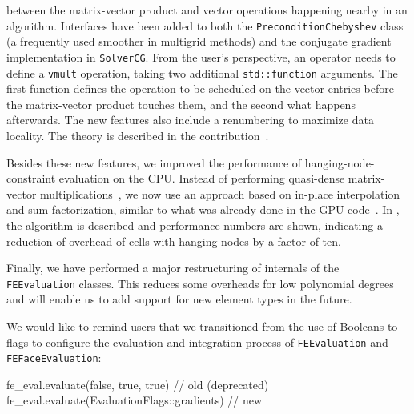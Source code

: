 \documentclass{ansarticle-preprint}
\begin{document}
\begin{itemize}
  between the matrix-vector product and vector operations happening nearby in
  an algorithm. Interfaces have been added to both the
  \texttt{PreconditionChebyshev} class (a frequently used smoother in multigrid
  methods) and the conjugate gradient implementation in \texttt{SolverCG}.
  From the user's perspective, an operator needs to define a \texttt{vmult} operation,
  taking two additional \texttt{std::function} arguments. The first function
  defines the operation to be scheduled on the vector entries before the
  matrix-vector product touches them, and the second what happens
  afterwards. The new features also include a renumbering to maximize data
  locality. The theory is described in the
  contribution~\cite{kronbichler2022cg}.
\end{itemize}
Besides these new features, we improved the performance of
hanging-node-constraint evaluation on the CPU. Instead of performing
quasi-dense matrix-vector multiplications~\cite{KronbichlerKormann2012}, we now use an
approach based on in-place interpolation and sum factorization, similar
to what was already done in the GPU code~\cite{ljungkvist2017matrix}. In \cite{munch2022hn}, the algorithm is described
and performance numbers are shown, indicating a reduction
of overhead of cells with hanging nodes by a factor of ten.

Finally, we have performed a major restructuring of internals
of the \texttt{FEEvaluation} classes. This reduces some overheads for low polynomial degrees and will enable us to add support for new element types in the future.

We would like to remind users that we transitioned from the use of Booleans
to flags to configure the evaluation and integration process of \texttt{FEEvaluation}
and \texttt{FEFaceEvaluation}:

\begin{c++}
fe\_eval.evaluate(false, true, true)          // old (deprecated)
fe\_eval.evaluate(EvaluationFlags::gradients) // new
\end{c++}

%
%
%
%
%
\end{document}
